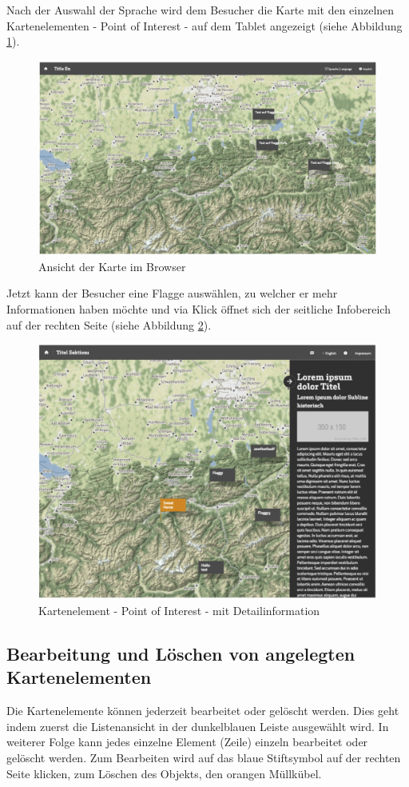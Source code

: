 Nach der Auswahl der Sprache wird dem Besucher die Karte mit den einzelnen Kartenelementen - Point of Interest - auf dem Tablet angezeigt (siehe Abbildung \ref{img:karte_browser}).

\begin{figure}[ht!]
\centering
\includegraphics[width=12cm]{Figures/paula/karte_browser.png}
\caption{Ansicht der Karte im Browser}
\label{img:karte_browser}
\end{figure}

Jetzt kann der Besucher eine Flagge auswählen, zu welcher er mehr Informationen haben möchte und via Klick öffnet sich der seitliche Infobereich auf der rechten Seite (siehe Abbildung \ref{img:kartenelement_detail}).

\begin{figure}[ht!]
\centering
\includegraphics[width=12cm]{Figures/paula/kartenelement_detail.png}
\caption{Kartenelement - Point of Interest - mit Detailinformation}
\label{img:kartenelement_detail}
\end{figure}

\subsection{Bearbeitung und Löschen von angelegten Kartenelementen}

Die Kartenelemente können jederzeit bearbeitet oder gelöscht werden. Dies geht indem zuerst die Listenansicht in der dunkelblauen Leiste ausgewählt wird. In weiterer Folge kann jedes einzelne Element (Zeile) einzeln bearbeitet oder gelöscht werden. Zum Bearbeiten wird auf das blaue Stiftsymbol auf der rechten Seite klicken, zum Löschen des Objekts, den orangen Müllkübel.



\cite{anno4j1}
